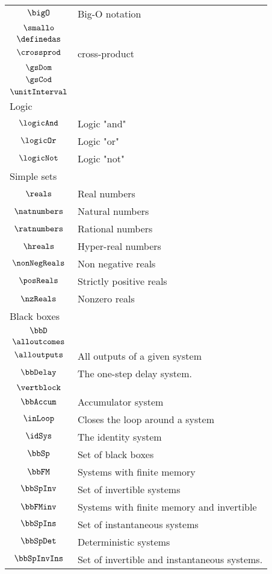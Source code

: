 \begin{longtable}{cl}
 $\bigO$ &  Big-O notation\\ 
 $\smallo$ & \\ 
 $\definedas$ & \\ 
 $\crossprod$ &  cross-product\\ 
 $\gsDom$ &  \\ 
 $\gsCod$ &  \\ 
 $\unitInterval$ & \\ 
 \multicolumn{2}{l}{Logic}\\ 
 \hline
$\logicAnd$ &  Logic "and"\\ 
 $\logicOr$ &  Logic "or"\\ 
 $\logicNot$ &  Logic "not"\\ 
 \multicolumn{2}{l}{Simple sets}\\ 
 \hline
$\reals$ &  Real numbers\\ 
 $\natnumbers$ &  Natural numbers\\ 
 $\ratnumbers$ &  Rational numbers\\ 
 $\hreals$ &  Hyper-real numbers\\ 
 $\nonNegReals$ &  Non negative reals \\ 
 $\posReals$ &  Strictly positive reals\\ 
 $\nzReals$ &  Nonzero reals\\ 
 \multicolumn{2}{l}{Black boxes}\\ 
 \hline
$\bbD$ & \\ 
 $\alloutcomes$ & \\ 
 $\alloutputs$ &  All outputs of a given system\\ 
 $\bbDelay$ &  The one-step delay system.\\ 
 $\vertblock$ & \\ 
 $\bbAccum$ &  Accumulator system\\ 
 $\inLoop$ &  Closes the loop around a system\\ 
 $\idSys$ &  The identity system\\ 
 $\bbSp$ &  Set of black boxes\\ 
 $\bbFM$ &  Systems with finite memory\\ 
 $\bbSpInv$ &  Set of invertible systems\\ 
 $\bbFMinv$ &  Systems with finite memory and invertible\\ 
 $\bbSpIns$ &  Set of instantaneous systems\\ 
 $\bbSpDet$ &  Deterministic systems\\ 
 $\bbSpInvIns$ &  Set of invertible and instantaneous systems.\\ 

\end{longtable}
